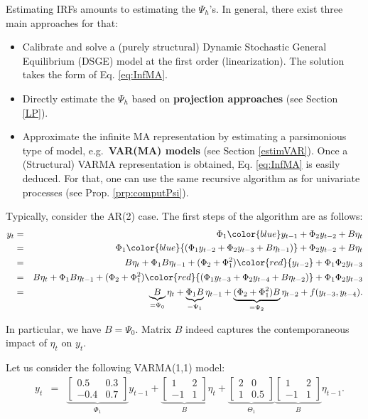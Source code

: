 \documentclass[
  12pt,
]{book}
\providecommand{\tightlist}{%
  \setlength{\itemsep}{0pt}\setlength{\parskip}{0pt}}
\theoremstyle{definition}
\theoremstyle{definition}
\theoremstyle{definition}
\theoremstyle{definition}
\theoremstyle{remark}
\begin{document}
Estimating IRFs amounts to estimating the \(\Psi_{h}\)'s. In general, there exist three main approaches for that:

\begin{itemize}
\tightlist
\item
  Calibrate and solve a (purely structural) Dynamic Stochastic General Equilibrium (DSGE) model at the first order (linearization). The solution takes the form of Eq. \eqref{eq:InfMA}.
\item
  Directly estimate the \(\Psi_{h}\) based on \textbf{projection approaches} (see Section \ref{LP}).
\item
  Approximate the infinite MA representation by estimating a parsimonious type of model, e.g.~\textbf{VAR(MA) models} (see Section \ref{estimVAR}). Once a (Structural) VARMA representation is obtained, Eq. \eqref{eq:InfMA} is easily deduced. For that, one can use the same recursive algorithm as for univariate processes (see Prop. \ref{prp:computPsi}).
\end{itemize}

Typically, consider the AR(2) case. The first steps of the algorithm are as follows:
\begin{eqnarray*}
y_t &=& \Phi_1 {\color{blue}y_{t-1}} + \Phi_2 y_{t-2} + B \eta_t  \\
&=& \Phi_1 \color{blue}{(\Phi_1 y_{t-2} + \Phi_2 y_{t-3} + B \eta_{t-1})} + \Phi_2 y_{t-2} + B \eta_t  \\
&=& B \eta_t + \Phi_1 B \eta_{t-1} + (\Phi_2 + \Phi_1^2) \color{red}{y_{t-2}} + \Phi_1\Phi_2 y_{t-3}  \\
&=& B \eta_t + \Phi_1 B \eta_{t-1} + (\Phi_2 + \Phi_1^2) \color{red}{(\Phi_1 y_{t-3} + \Phi_2 y_{t-4} + B \eta_{t-2})} + \Phi_1\Phi_2 y_{t-3} \\
&=& \underbrace{B}_{=\Psi_0} \eta_t + \underbrace{\Phi_1 B}_{=\Psi_1} \eta_{t-1} + \underbrace{(\Phi_2 + \Phi_1^2)B}_{=\Psi_2} \eta_{t-2} + f(y_{t-3},y_{t-4}).
\end{eqnarray*}

In particular, we have \(B = \Psi_0\). Matrix \(B\) indeed captures the contemporaneous impact of \(\eta_t\) on \(y_t\).

Let us consider the following VARMA(1,1) model:
\begin{eqnarray}
\quad y_t &=&
\underbrace{\left[\begin{array}{cc}
0.5 & 0.3 \\
-0.4 & 0.7
\end{array}\right]}_{\Phi_1}
y_{t-1} +  
\underbrace{\left[\begin{array}{cc}
1 & 2 \\
-1 & 1
\end{array}\right]}_{B}\eta_t + \underbrace{\left[\begin{array}{cc}
2 & 0 \\
1 & 0.5
\end{array}\right]}_{\Theta_1} \underbrace{\left[\begin{array}{cc}
1 & 2 \\
-1 & 1
\end{array}\right]}_{B}\eta_{t-1}.\label{eq:VARMA111}
\end{eqnarray}
\end{document}
